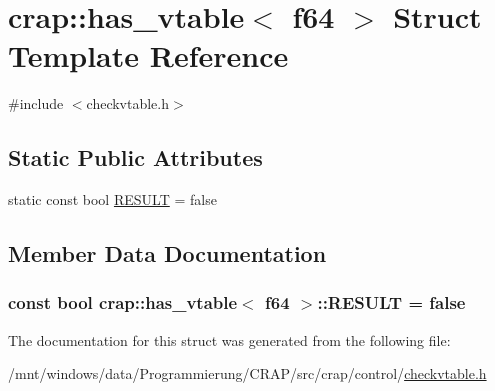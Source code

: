 \hypertarget{structcrap_1_1has__vtable_3_01f64_01_4}{\section{crap\-:\-:has\-\_\-vtable$<$ f64 $>$ Struct Template Reference}
\label{structcrap_1_1has__vtable_3_01f64_01_4}
}


{\ttfamily \#include $<$checkvtable.\-h$>$}

\subsection*{Static Public Attributes}
\begin{DoxyCompactItemize}
\item 
static const bool \hyperlink{structcrap_1_1has__vtable_3_01f64_01_4_abf7cca7fd109cbadc33b642483ecaa69}{R\-E\-S\-U\-L\-T} = false
\end{DoxyCompactItemize}


\subsection{Member Data Documentation}
\hypertarget{structcrap_1_1has__vtable_3_01f64_01_4_abf7cca7fd109cbadc33b642483ecaa69}{
\subsubsection[{R\-E\-S\-U\-L\-T}]{\setlength{\rightskip}{0pt plus 5cm}const bool {\bf crap\-::has\-\_\-vtable}$<$ {\bf f64} $>$\-::R\-E\-S\-U\-L\-T = false\hspace{0.3cm}{\ttfamily [static]}}}\label{structcrap_1_1has__vtable_3_01f64_01_4_abf7cca7fd109cbadc33b642483ecaa69}


The documentation for this struct was generated from the following file\-:\begin{DoxyCompactItemize}
\item 
/mnt/windows/data/\-Programmierung/\-C\-R\-A\-P/src/crap/control/\hyperlink{checkvtable_8h}{checkvtable.\-h}\end{DoxyCompactItemize}
